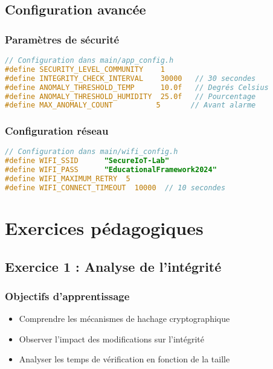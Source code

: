 \section{Configuration avancée}

\subsection{Paramètres de sécurité}

\begin{lstlisting}[language=C, caption=Configuration sécurité Community]
// Configuration dans main/app_config.h
#define SECURITY_LEVEL_COMMUNITY    1
#define INTEGRITY_CHECK_INTERVAL    30000   // 30 secondes
#define ANOMALY_THRESHOLD_TEMP      10.0f   // Degrés Celsius
#define ANOMALY_THRESHOLD_HUMIDITY  25.0f   // Pourcentage
#define MAX_ANOMALY_COUNT          5       // Avant alarme
\end{lstlisting}

\subsection{Configuration réseau}

\begin{lstlisting}[language=C, caption=Configuration Wi-Fi]
// Configuration dans main/wifi_config.h
#define WIFI_SSID      "SecureIoT-Lab"
#define WIFI_PASS      "EducationalFramework2024"
#define WIFI_MAXIMUM_RETRY  5
#define WIFI_CONNECT_TIMEOUT  10000  // 10 secondes
\end{lstlisting}

\chapter{Exercices pédagogiques}
\label{app:exercises}

\section{Exercice 1 : Analyse de l'intégrité}

\subsection{Objectifs d'apprentissage}

\begin{itemize}
    \item Comprendre les mécanismes de hachage cryptographique
    \item Observer l'impact des modifications sur l'intégrité
    \item Analyser les temps de vérification en fonction de la taille
\end{itemize}

